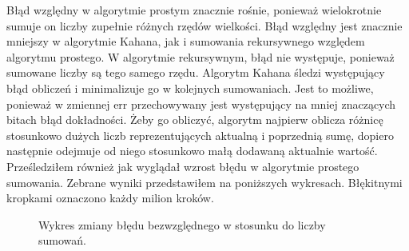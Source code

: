 \documentclass{article}
\begin{document}
        Błąd względny w algorytmie prostym znacznie rośnie, ponieważ wielokrotnie sumuje on liczby zupełnie różnych rzędów wielkości. Błąd względny jest znacznie mniejszy w algorytmie Kahana, jak i sumowania rekursywnego względem algorytmu prostego. W algorytmie rekursywnym, błąd nie występuje, ponieważ sumowane liczby są tego samego rzędu. Algorytm Kahana śledzi występujący błąd obliczeń i minimalizuje go w kolejnych sumowaniach. Jest to możliwe, ponieważ w zmiennej err przechowywany jest występujący na mniej znaczących bitach błąd dokładności. Żeby go obliczyć, algorytm najpierw oblicza różnicę stosunkowo dużych liczb reprezentujących aktualną i poprzednią sumę, dopiero następnie odejmuje od niego stosunkowo małą dodawaną aktualnie wartość. \\ 
        Prześledziłem również jak wyglądał wzrost błędu w algorytmie prostego sumowania. Zebrane wyniki przedstawiłem na poniższych wykresach. Błękitnymi kropkami oznaczono każdy milion kroków. 
        \begin{figure}[h!]
            \centering
            \caption{Wykres zmiany błędu bezwzględnego w stosunku do liczby sumowań.}
        \end{figure}\\
\end{document}
